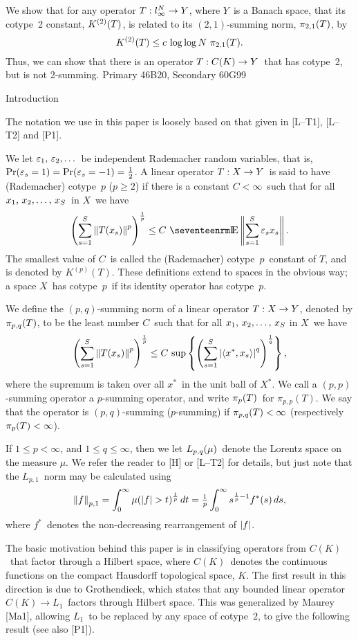 \Abstract

We show that for any operator $T:{l_\infty^N}\to Y$, where $Y$\ is a Banach
space, that its cotype~2 constant, $K^{(2)}(T)$, is related to its
$(2,1)$-summing
norm, $\pi_{2,1}(T)$, by
$$ K^{(2)}(T) \le c \, \log\log N \,\, \pi_{2,1}(T) .$$
Thus, we can show that there is an operator $T:C(K)\to Y$\ that has cotype~2, but is
not 2-summing.
\medskip\moreabstract{} Primary 46B20,
Secondary 60G99

\firstbeginsection Introduction

The notation we use in this paper is loosely based on that given in 
[L--T1], [L--T2] and [P1].

We let $\epsilonlist$\ be independent
Rademacher random variables, that is, $\Pr(\varepsilon_s=1) =
\Pr(\varepsilon_s=-1) = {\textstyle{{1\over 2}}} $.
A linear operator $T:X\to Y$\ is said to have {\dt (Rademacher) cotype~$p$\/}
($p\ge2$) if there is a constant $C<\infty$\ such that for all $\xS$\
in $X$\ we
have 
$$ \pthmpTxs \le C \,\, \E \Bernwalk. $$
The smallest value of $C$\ is called the {\dt (Rademacher)
cotype~$p$\ constant\/} of $T$, and is denoted by $K^{(p)}(T)$. These
definitions extend to spaces in the obvious way; a space $X$\ has
cotype~$p$\
if its identity operator has cotype~$p$.

We define the {\dt $(p,q)$-summing norm\/} of a linear operator
$T:X\to Y$, denoted
by $\pi_{p,q}(T)$, to be the least number $C$\ such that for all $\xS$ in
$X$\ we have 
$$ \pthmpTxs \le C \, \wkqnormxs, $$ 
where the supremum is taken over all $x^*$\ in the unit ball of $X^*$.
We call a $(p,p)$-summing operator a {\dt $p$-summing operator\/},
and write $\pi_p(T)$\ for $\pi_{p,p}(T)$. We say that the operator is
{\dt $(p,q)$-summing\/} ({\dt $p$-summing\/}) if $\pi_{p,q}(T) < \infty$
(respectively $\pi_p(T) < \infty$).

If $1\le p<\infty$, and $1\le q \le \infty$, then we let ${L_{p,q}}(\mu)$\
denote the
Lorentz space on the measure $\mu$. We
refer the reader to [H] or [L--T2] for details, but just note that the
$L_{p,1}$\ norm may be calculated using
$$ \left\| f \right\|_{p,1} = \int_0^\infty \mu(\left| f \right| > t)^{1\over p} \,dt 
   = {\textstyle{{1\over p}}} \int_0^\infty s^{{1\over p}-1} f^*(s) \,ds ,$$
where $f^*$\ denotes the non-decreasing rearrangement of $\left| f \right|$.

The basic motivation behind this paper is in classifying operators
from $C(K)$\
that factor through a Hilbert space, where $C(K)$\ denotes the
continuous
functions on the compact Hausdorff topological space, $K$. The first result in
this direction is due to Grothendieck,
which
states that any bounded linear operator $C(K) \to L_1$\  factors
through Hilbert
space. This was generalized by Maurey [Ma1], allowing $L_1$\ to be
replaced by any space of cotype~$2$, to give the following result (see also
[P1]).

